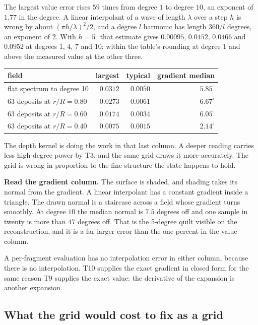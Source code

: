 The largest value error rises \(59\) times from degree \(1\) to degree \(10\), an exponent of \(1.77\) in the degree. A linear interpolant of a wave of length \(\lambda\) over a step \(h\) is wrong by about \((\pi h/\lambda)^2/2\), and a degree \(l\) harmonic has length \(360/l\) degrees, an exponent of \(2\). With \(h = 5^\circ\) that estimate gives \(0.00095\), \(0.0152\), \(0.0466\) and \(0.0952\) at degrees \(1\), \(4\), \(7\) and \(10\): within the table's rounding at degree \(1\) and above the measured value at the other three.

\begin{center}
\begin{tabular}{@{}lrrr@{}}
\toprule
field & largest & typical & gradient median \\
\midrule
flat spectrum to degree 10 & \(0.0312\) & \(0.0050\) & \(5.85^\circ\) \\
63 deposits at \(r/R = 0.80\) & \(0.0273\) & \(0.0061\) & \(6.67^\circ\) \\
63 deposits at \(r/R = 0.60\) & \(0.0174\) & \(0.0034\) & \(6.05^\circ\) \\
63 deposits at \(r/R = 0.40\) & \(0.0075\) & \(0.0015\) & \(2.14^\circ\) \\
\bottomrule
\end{tabular}
\end{center}

The depth kernel is doing the work in that last column. A deeper reading carries less high-degree power by T3, and the same grid draws it more accurately. The grid is wrong in proportion to the fine structure the state happens to hold.

\textbf{Read the gradient column.} The surface is shaded, and shading takes its normal from the gradient. A linear interpolant has a constant gradient inside a triangle. The drawn normal is a staircase across a field whose gradient turns smoothly. At degree \(10\) the median normal is \(7.5\) degrees off and one sample in twenty is more than \(47\) degrees off. That is the 5-degree quilt visible on the reconstruction, and it is a far larger error than the one percent in the value column.

A per-fragment evaluation has no interpolation error in either column, because there is no interpolation. T10 supplies the exact gradient in closed form for the same reason T9 supplies the exact value: the derivative of the expansion is another expansion.

\subsection{What the grid would cost to fix as a grid}

